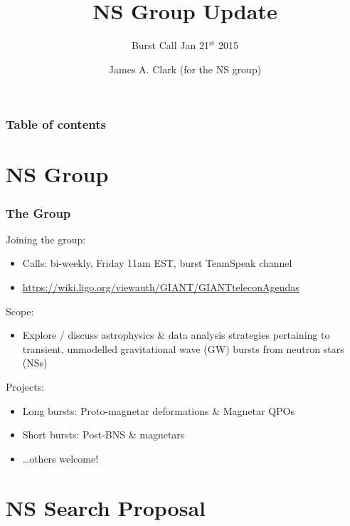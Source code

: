 \documentclass{beamer}
\def\gw#1{gravitational wave#1 (GW#1)\gdef\gw{GW}}
\def\ns#1{neutron star#1 (NS#1)\gdef\ns{NS}}
\begin{document}
\title{NS Group Update}
\subtitle{Burst Call Jan 21$^{\text{st}}$ 2015}  
\author{James A. Clark (for the NS group)}
\date{} 

\begin{frame}[plain]
\titlepage
\end{frame}

\begin{frame}\frametitle{Table of contents}\tableofcontents
\end{frame} 

\section{NS Group}

\begin{frame}
    \frametitle{The Group}
    Joining the group:
    \begin{itemize}
        \item Calls: bi-weekly, Friday 11am EST, burst TeamSpeak channel
        \item
            {\small\href{https://wiki.ligo.org/viewauth/GIANT/GIANTteleconAgendas}
            {https://wiki.ligo.org/viewauth/GIANT/GIANTteleconAgendas}}
    \end{itemize}
    Scope:
    \begin{itemize}
        \item Explore / discuss astrophysics \& data analysis strategies
            pertaining to transient, unmodelled \gw{} bursts from \ns{s}
    \end{itemize}
    Projects:
    \begin{itemize}
        \item Long bursts: Proto-magnetar deformations \& Magnetar QPOs
        \item Short bursts: Post-BNS \& magnetars
        \item \dots others welcome!
    \end{itemize}
\end{frame}

\section{NS Search Proposal}
\end{document}
